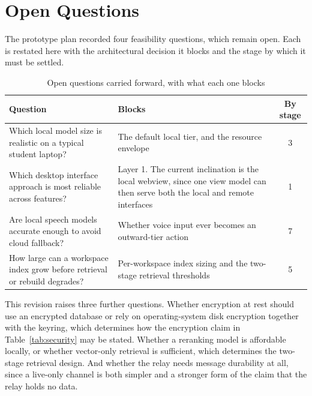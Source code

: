 \documentclass[11pt]{article}
\begin{document}
\section{Open Questions}

The prototype plan recorded four feasibility questions, which remain open. Each is
restated here with the architectural decision it blocks and the stage by which it must be
settled.

\begin{table}[htbp]
\centering
\small
\caption{Open questions carried forward, with what each one blocks}
\label{tab:open}
\begin{tabular}{@{}p{}p{}c@{}}
\toprule
\textbf{Question} & \textbf{Blocks} & \textbf{By stage} \\
\midrule
Which local model size is realistic on a typical student laptop? & The default local tier, and the resource envelope & 3 \\
\addlinespace
Which desktop interface approach is most reliable across features? & Layer 1. The current inclination is the local webview, since one view model can then serve both the local and remote interfaces & 1 \\
\addlinespace
Are local speech models accurate enough to avoid cloud fallback? & Whether voice input ever becomes an outward-tier action & 7 \\
\addlinespace
How large can a workspace index grow before retrieval or rebuild degrades? & Per-workspace index sizing and the two-stage retrieval thresholds & 5 \\
\bottomrule
\end{tabular}
\end{table}

This revision raises three further questions. Whether encryption at rest should use an
encrypted database or rely on operating-system disk encryption together with the keyring,
which determines how the encryption claim in Table~\ref{tab:security} may be stated.
Whether a reranking model is affordable locally, or whether vector-only retrieval is
sufficient, which determines the two-stage retrieval design. And whether the relay needs
message durability at all, since a live-only channel is both simpler and a stronger form
of the claim that the relay holds no data.

\end{document}

